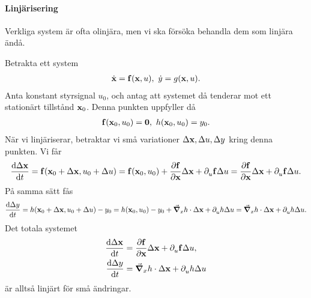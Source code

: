 \paragraph{Linjärisering}
Verkliga system är ofta olinjära, men vi ska försöka behandla dem som linjära ändå.

Betrakta ett system
\begin{align*}
	\dot{\vb{x}} = \vb{f}(\vb{x}, u),\ \dot{y} = g(\vb{x}, u).
\end{align*}
Anta konstant styrsignal $u_{0}$, och antag att systemet då tenderar mot ett stationärt tillstånd $\vb{x}_{0}$. Denna punkten uppfyller då
\begin{align*}
	\vb{f}(\vb{x}_{0}, u_{0}) = \vb{0},\ h(\vb{x}_{0}, u_{0}) = y_{0}.
\end{align*}
När vi linjäriserar, betraktar vi små variationer $\Delta\vb{x}, \Delta u, \Delta y$ kring denna punkten. Vi får
\begin{align*}
	\dv{\Delta\vb{x}}{t} = \vb{f}(\vb{x}_{0} + \Delta\vb{x}, u_{0} + \Delta u) = \vb{f}(\vb{x}_{0}, u_{0}) + \pdv{\vb{f}}{\vb{x}}\Delta\vb{x} + \partial_{u}^{}\vb{f}\Delta u = \pdv{\vb{f}}{\vb{x}}\Delta\vb{x} + \partial_{u}^{}\vb{f}\Delta u.
\end{align*}
På samma sätt fås
\begin{align*}
	\dv{\Delta y}{t} = h(\vb{x}_{0} + \Delta\vb{x}, u_{0} + \Delta u) - y_{0} = h(\vb{x}_{0}, u_{0}) - y_{0} + \grad_{x}{h}\cdot\Delta\vb{x} + \partial_{u}^{}h\Delta u = \grad_{x}{h}\cdot\Delta\vb{x} + \partial_{u}^{}h\Delta u.
\end{align*}
Det totala systemet
\begin{align*}
	\dv{\Delta\vb{x}}{t} &= \pdv{\vb{f}}{\vb{x}}\Delta\vb{x} + \partial_{u}^{}\vb{f}\Delta u, \\
	\dv{\Delta y}{t}     &= \grad_{x}{h}\cdot\Delta\vb{x} + \partial_{u}^{}h\Delta u
\end{align*}
är alltså linjärt för små ändringar.
